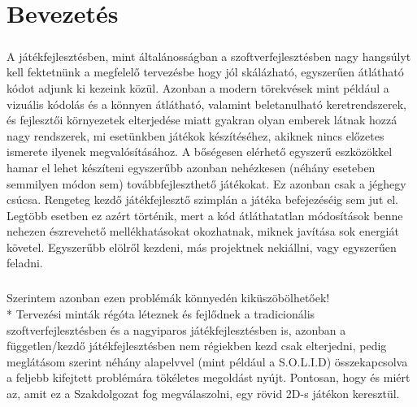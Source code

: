 \chapter{Bevezetés} %
\label{ch:intro}

\paragraph{}
A játékfejlesztésben, mint általánosságban a szoftverfejlesztésben nagy hangsúlyt kell fektetnünk a megfelelő tervezésbe hogy jól skálázható, egyszerűen átlátható kódot adjunk ki kezeink közül. Azonban a modern törekvések mint például a vizuális kódolás és a könnyen átlátható, valamint beletanulható keretrendszerek, és fejlesztői környezetek elterjedése miatt gyakran olyan emberek látnak hozzá nagy rendszerek, mi esetünkben játékok készítéséhez, akiknek nincs előzetes ismerete ilyenek megvalósításához. A bőségesen elérhető egyszerű eszközökkel hamar el lehet készíteni egyszerűbb azonban nehézkesen (néhány eseteben semmilyen módon sem) továbbfejleszthető játékokat. Ez azonban csak a jéghegy csúcsa. Rengeteg kezdő játékfejlesztő szimplán a játéka befejezéséig sem jut el. Legtöbb esetben ez azért történik, mert a kód átláthatatlan módosítások benne nehezen észrevehető mellékhatásokat okozhatnak, miknek javítása sok energiát követel. Egyszerűbb elölről kezdeni, más projektnek nekiállni, vagy egyszerűen feladni.
\paragraph{}
Szerintem azonban ezen problémák könnyedén kiküszöbölhetőek!\\*
Tervezési minták régóta léteznek és fejlődnek a tradicionális szoftverfejlesztésben és a nagyiparos játékfejlesztésben is, azonban a független/kezdő játékfejlesztésben nem régiekben kezd csak elterjedni, pedig meglátásom szerint néhány alapelvvel (mint például a S.O.L.I.D) összekapcsolva a feljebb kifejtett problémára tökéletes megoldást nyújt. Pontosan, hogy és miért az, amit ez a Szakdolgozat fog megválaszolni, egy rövid 2D-s játékon keresztül.

